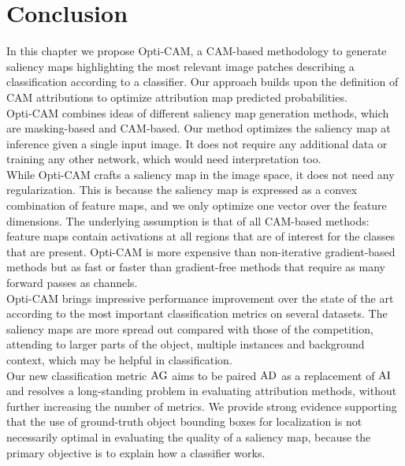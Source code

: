 \section{Conclusion}
\label{sec:conclusion}
In this chapter we propose Opti-CAM, a CAM-based methodology to generate saliency maps highlighting 
the most relevant image patches describing a classification according to a classifier. Our approach 
builds upon the definition of CAM attributions to optimize attribution map predicted probabilities.\\

\noindent Opti-CAM combines ideas of different saliency map generation methods, which are masking-based 
and CAM-based. Our method optimizes the saliency map at inference given a single input image. It does 
not require any additional data or training any other network, which would need interpretation too.\\

\noindent While Opti-CAM crafts a saliency map in the image space, it does not need any 
regularization. This is because the saliency map is expressed as a convex combination of feature 
maps, and we only optimize one vector over the feature dimensions. The underlying assumption is 
that of all CAM-based methods: feature maps contain activations at all regions that are of 
interest for the classes that are present. Opti-CAM is more expensive than non-iterative 
gradient-based methods but as fast or faster than gradient-free methods that require as many 
forward passes as channels.\\

\noindent Opti-CAM brings impressive performance improvement over the state of the 
art according to the most important classification metrics on several datasets. The saliency maps 
are more spread out compared with those of the competition, attending to larger parts of the object, 
multiple instances and background context, which may be helpful in classification.\\


\noindent Our new classification metric $\operatorname{AG}$ aims to be paired $\operatorname{AD}$ as a replacement of 
$\operatorname{AI}$ and resolves a long-standing problem in evaluating attribution methods, without further 
increasing the number of metrics. We provide strong evidence supporting that the use of 
ground-truth object bounding boxes for localization is not necessarily optimal in evaluating 
the quality of a saliency map, because the primary objective is to explain how a classifier works.

